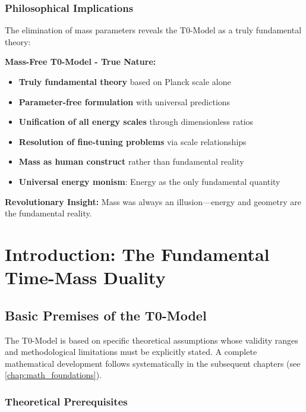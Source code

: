 \documentclass[12pt,a4paper]{report}
\begin{document}
\subsection*{Philosophical Implications}

The elimination of mass parameters reveals the T0-Model as a truly fundamental theory:

\textbf{Mass-Free T0-Model - True Nature:}
\begin{itemize}
	\item \textbf{Truly fundamental theory} based on Planck scale alone
	\item \textbf{Parameter-free formulation} with universal predictions
	\item \textbf{Unification of all energy scales} through dimensionless ratios
	\item \textbf{Resolution of fine-tuning problems} via scale relationships
	\item \textbf{Mass as human construct} rather than fundamental reality
	\item \textbf{Universal energy monism}: Energy as the only fundamental quantity
\end{itemize}

\textbf{Revolutionary Insight:} Mass was always an illusion—energy and geometry are the fundamental reality.	
\chapter{Introduction: The Fundamental Time-Mass Duality}\label{chap:introduction}

\section{Basic Premises of the T0-Model}\label{sec:basic_premises}

The T0-Model is based on specific theoretical assumptions whose validity ranges and methodological limitations must be explicitly stated. A complete mathematical development follows systematically in the subsequent chapters (see \autoref{chap:math_foundations}).

\subsection{Theoretical Prerequisites}\label{subsec:theoretical_prerequisites}
\end{document}
